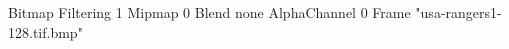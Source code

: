 {Bitmap
	{Filtering 1}
	{Mipmap 0}
	{Blend none}
	{AlphaChannel 0}
	{Frame "usa-rangers1-128.tif.bmp"}
}
